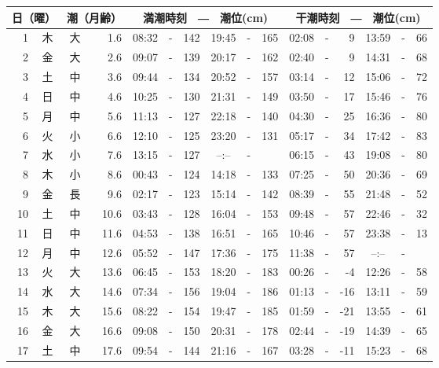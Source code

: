\documentclass[12pt.a4j]{jsarticle}
\begin{document}
\begin{center}
\begin{table}[ht]
    \begin{tabular}{|rc|cr|ccrccr|ccrccr|}
    \hline
    \multicolumn{2}{|c|}{日（曜）} & \multicolumn{2}{c|}{潮（月齢）} & \multicolumn{6}{c|}{満潮時刻　―　潮位(cm)} & \multicolumn{6}{c|}{干潮時刻　―　潮位(cm)} \\
 \hline
 1 & 木 & 大 &  1.6 &  08:32 &-& 142  &  19:45 &-& 165  &   02:08 &-&   9  &   13:59 &-&  66  \\
 2 & 金 & 大 &  2.6 &  09:07 &-& 139  &  20:17 &-& 162  &   02:40 &-&   9  &   14:31 &-&  68  \\
 3 & 土 & 中 &  3.6 &  09:44 &-& 134  &  20:52 &-& 157  &   03:14 &-&  12  &   15:06 &-&  72  \\
 4 & 日 & 中 &  4.6 &  10:25 &-& 130  &  21:31 &-& 149  &   03:50 &-&  17  &   15:46 &-&  76  \\
 5 & 月 & 中 &  5.6 &  11:13 &-& 127  &  22:18 &-& 140  &   04:30 &-&  25  &   16:36 &-&  80  \\
 6 & 火 & 小 &  6.6 &  12:10 &-& 125  &  23:20 &-& 131  &   05:17 &-&  34  &   17:42 &-&  83  \\
 7 & 水 & 小 &  7.6 &  13:15 &-& 127  &  --:-- &-&     &   06:15 &-&  43  &   19:08 &-&  80  \\
 8 & 木 & 小 &  8.6 &  00:43 &-& 124  &  14:18 &-& 133  &   07:25 &-&  50  &   20:36 &-&  69  \\
 9 & 金 & 長 &  9.6 &  02:17 &-& 123  &  15:14 &-& 142  &   08:39 &-&  55  &   21:48 &-&  52  \\
10 & 土 & 中 & 10.6 &  03:43 &-& 128  &  16:04 &-& 153  &   09:48 &-&  57  &   22:46 &-&  32  \\
11 & 日 & 中 & 11.6 &  04:53 &-& 138  &  16:51 &-& 165  &   10:46 &-&  57  &   23:38 &-&  13  \\
12 & 月 & 中 & 12.6 &  05:52 &-& 147  &  17:36 &-& 175  &   11:38 &-&  57  &   --:-- &-&     \\
13 & 火 & 大 & 13.6 &  06:45 &-& 153  &  18:20 &-& 183  &   00:26 &-&  -4  &   12:26 &-&  58  \\
14 & 水 & 大 & 14.6 &  07:34 &-& 156  &  19:04 &-& 186  &   01:13 &-& -16  &   13:11 &-&  59  \\
15 & 木 & 大 & 15.6 &  08:22 &-& 154  &  19:47 &-& 185  &   01:59 &-& -21  &   13:55 &-&  61  \\
16 & 金 & 大 & 16.6 &  09:08 &-& 150  &  20:31 &-& 178  &   02:44 &-& -19  &   14:39 &-&  65  \\
17 & 土 & 中 & 17.6 &  09:54 &-& 144  &  21:16 &-& 167  &   03:28 &-& -11  &   15:23 &-&  68  \\

\end{tabular}
\end{table}
\end{center}
\end{document}

